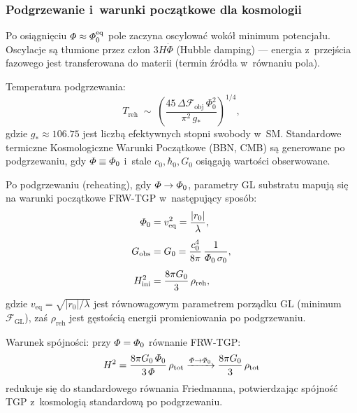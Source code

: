 \subsubsection{Podgrzewanie i~warunki pocz\k{a}tkowe dla kosmologii}

Po osi\k{a}gni\k{e}ciu $\varPhi \approx \varPhi_0^{\mathrm{eq}}$
pole zaczyna oscylowa\'c wok\'o\l{} minimum potencja\l{}u.
Oscylacje s\k{a} t\l{}umione przez cz\l{}on $3H\dot\Phi$
(Hubble damping) --- energia z~przej\'scia fazowego
jest transferowana do materii (termin \'zr\'od\l{}a
w~r\'ownaniu pola).

\begin{proposition}\label{prop:reheating}
Temperatura podgrzewania:
\begin{equation}\label{eq:T-reheat}
    T_\mathrm{reh}
    \;\sim\; \left(\frac{45\,\Delta\mathcal{F}_\mathrm{obj}\,\Phi_0^2}
                        {\pi^2\,g_*}\right)^{1/4},
\end{equation}
gdzie $g_* \approx 106.75$ jest liczb\k{a} efektywnych
stopni swobody w~SM.
Standardowe termiczne Kosmologiczne Warunki Pocz\k{a}tkowe
(BBN, CMB) s\k{a} generowane po podgrzewaniu,
gdy $\varPhi \equiv \varPhi_0$ i~stale $c_0, \hbar_0, G_0$ osi\k{a}gaj\k{a}
warto\'sci obserwowane.
\end{proposition}

\begin{proposition}\label{prop:GL-FRW-bridge}
Po podgrzewaniu (reheating), gdy $\varPhi \to \varPhi_0$,
parametry GL substratu mapuj\k{a} si\k{e} na warunki
pocz\k{a}tkowe FRW-TGP w~nast\k{e}puj\k{a}cy spos\'ob:
\begin{align}
    \varPhi_0 &= v_{\mathrm{eq}}^2
    = \frac{|r_0|}{\lambda},
    \label{eq:Phi0-from-veq}\\[4pt]
    G_{\mathrm{obs}} &= G_0
    = \frac{c_0^4}{8\pi}\,\frac{1}{\varPhi_0\,\sigma_0},
    \label{eq:G-from-Phi0}\\[4pt]
    H_{\mathrm{ini}}^2 &= \frac{8\pi G_0}{3}\,\rho_{\mathrm{reh}},
    \label{eq:H-ini-FRW}
\end{align}
gdzie $v_{\mathrm{eq}} = \sqrt{|r_0|/\lambda}$ jest
r\'ownowagowym parametrem porz\k{a}dku GL (minimum
$\mathcal{F}_{\mathrm{GL}}$), za\'s $\rho_{\mathrm{reh}}$
jest g\k{e}sto\'sci\k{a} energii promieniowania po podgrzewaniu.

Warunek spójności: przy $\varPhi = \varPhi_0$ r\'ownanie FRW-TGP:
\begin{equation}\label{eq:FRW-TGP-ini}
    H^2 = \frac{8\pi G_0\,\varPhi_0}{3\,\varPhi}\,\rho_{\mathrm{tot}}
    \xrightarrow{\varPhi \to \varPhi_0}
    \frac{8\pi G_0}{3}\,\rho_{\mathrm{tot}}
\end{equation}
redukuje si\k{e} do standardowego r\'ownania Friedmanna,
potwierdzaj\k{a}c sp\'ojno\'s\'c TGP z~kosmologi\k{a} standardow\k{a}
po podgrzewaniu.
\end{proposition}

